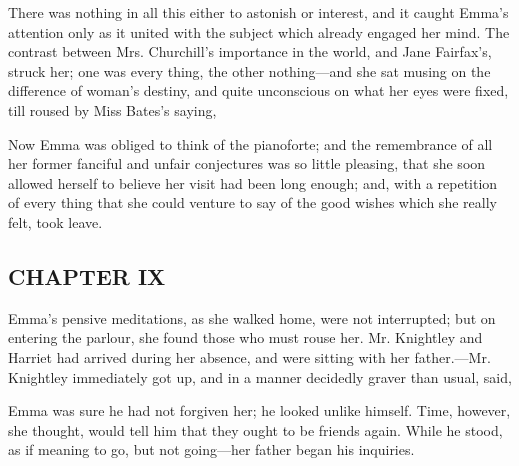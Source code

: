 There was nothing in all this either to astonish or interest, and it caught Emma's attention only as it united with the subject which already engaged her mind. The contrast between Mrs. Churchill's importance in the world, and Jane Fairfax's, struck her; one was every thing, the other nothing---and she sat musing on the difference of woman's destiny, and quite unconscious on what her eyes were fixed, till roused by Miss Bates's saying,


Now Emma was obliged to think of the pianoforte; and the remembrance of all her former fanciful and unfair conjectures was so little pleasing, that she soon allowed herself to believe her visit had been long enough; and, with a repetition of every thing that she could venture to say of the good wishes which she really felt, took leave.

\subsection[chapter-ix-2]{\useURL[url47][][][]\from[url47]CHAPTER IX}

Emma's pensive meditations, as she walked home, were not interrupted; but on entering the parlour, she found those who must rouse her. Mr. Knightley and Harriet had arrived during her absence, and were sitting with her father.---Mr. Knightley immediately got up, and in a manner decidedly graver than usual, said,




Emma was sure he had not forgiven her; he looked unlike himself. Time, however, she thought, would tell him that they ought to be friends again. While he stood, as if meaning to go, but not going---her father began his inquiries.

